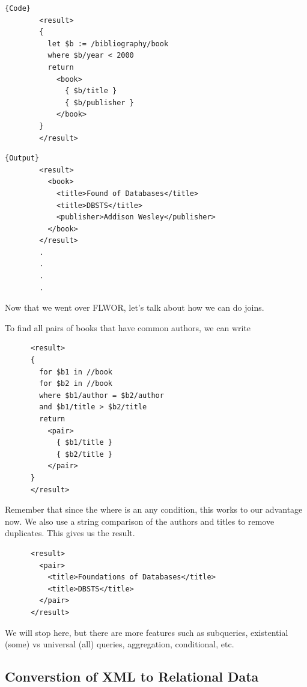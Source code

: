 \begin{example}
    \noindent\begin{minipage}{.5\textwidth}
      \begin{lstlisting}[]{Code}
        <result>
        {
          let $b := /bibliography/book
          where $b/year < 2000
          return 
            <book>
              { $b/title }
              { $b/publisher }
            </book>
        }
        </result>          
      \end{lstlisting}
      \end{minipage}
      \hfill
      \begin{minipage}{.49\textwidth}
      \begin{lstlisting}[]{Output}
        <result>
          <book>
            <title>Found of Databases</title>
            <title>DBSTS</title>
            <publisher>Addison Wesley</publisher>
          </book>
        </result>
        .
        .
        .
        .
      \end{lstlisting}
    \end{minipage}
  \end{example}

  Now that we went over FLWOR, let's talk about how we can do joins. 

  \begin{example}
    \label{ex:explicit-join}
    To find all pairs of books that have common authors, we can write 
    \begin{lstlisting}
      <result>
      {
        for $b1 in //book
        for $b2 in //book
        where $b1/author = $b2/author
        and $b1/title > $b2/title
        return
          <pair>
            { $b1/title }
            { $b2/title }
          </pair>
      }
      </result> 
    \end{lstlisting}
    Remember that since the where is an any condition, this works to our advantage now. We also use a string comparison of the authors and titles to remove duplicates. This gives us the result. 
    \begin{lstlisting}
      <result>
        <pair>
          <title>Foundations of Databases</title>
          <title>DBSTS</title>
        </pair>
      </result> 
    \end{lstlisting}
  \end{example}

  We will stop here, but there are more features such as subqueries, existential (some) vs universal (all) queries, aggregation, conditional, etc. 

\subsection{Converstion of XML to Relational Data} 
  
